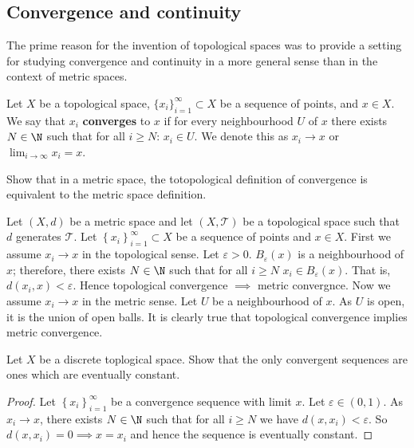
\subsection{Convergence and continuity}

The prime reason for the invention of topological spaces was to provide a
setting for studying convergence and continuity in a more general sense 
than in the context of metric spaces.

\begin{definition}[Convergence]
	Let $X$ be a topological space, $ 
		\{ x_i \}_{i=1}^{\infty} \subset X 
	$ be a sequence of points, and $x \in X$.
	We say that $x_i$ \textbf{converges} to $x$ if for every neighbourhood $U$
	of $x$ there exists $N \in \N$ such that for all $i \geq N$: $x_i \in U$.
	We denote this as $x_i \to x$ or $\lim_{i \to \infty} x_i = x$.
\end{definition}

\begin{problem}
	Show that in a metric space, the totopological definition of convergence is
	equivalent to the metric space definition.
\end{problem}

\begin{solution}
	Let $(X,d)$ be a metric space and let $(X,\mathcal T)$ be a topological space
	such that $d$ generates $\mathcal T$.
	Let $
		\left\{ x_i \right\}_{i=1}^\infty \subset X
	$ be a sequence of points and $x \in X$.
	First we assume $x_i \to x$ in the topological sense.
	Let $\varepsilon > 0$.
	$B_\varepsilon(x)$ is a neighbourhood of $x$;
	therefore, there exists $N \in \N$ such that for all $i \geq N$
	$x_i \in B_\varepsilon(x)$.
	That is,
	$d(x_i, x) < \varepsilon$.
	Hence topological convergence $\implies$ metric convergnce.
	Now we assume $x_i \to x$ in the metric sense.
	Let $U$ be a neighbourhood of $x$.
	As $U$ is open, it is the union of open balls.
	It is clearly true that topological convergence
	implies metric convergence.
\end{solution}

\begin{problem}
	Let $X$ be a discrete toplogical space.
	Show that the only convergent sequences are ones which are eventually
	constant.
\end{problem}

\begin{proof}
	Let $
		\left\{ x_i \right\}_{i=1}^\infty
	$ be a convergence sequence with limit $x$.
	Let $\varepsilon \in (0,1)$.
	As $x_i \to x$, there exists $N \in \N$ such that for all $i \geq N$
	we have $d(x,x_i) < \varepsilon$. So $d(x,x_i)=0 \implies x = x_i$ and hence
	the sequence is eventually constant.
\end{proof}

